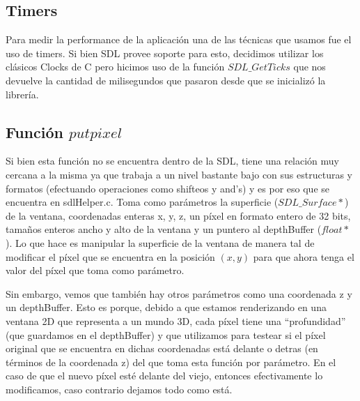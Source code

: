 \documentclass[a4paper]{article}
\begin{document}
\subsection{Timers}
Para medir la performance de la aplicación una de las técnicas que usamos fue el uso de timers. Si bien SDL provee soporte para esto, decidimos utilizar los clásicos Clocks de C pero hicimos uso de la función $SDL\_GetTicks$ que nos devuelve la cantidad de milisegundos que pasaron desde que se inicializó la librería.

\subsection{Función $putpixel$}
Si bien esta función no se encuentra dentro de la SDL, tiene una relación muy cercana a la misma ya que trabaja a un nivel bastante bajo con sus estructuras y formatos (efectuando operaciones como shifteos y and's) y es por eso que se encuentra en sdlHelper.c.
Toma como parámetros la superficie ($SDL\_Surface*$) de la ventana, coordenadas enteras x, y, z, un píxel en formato entero de 32 bits, tamaños enteros ancho y alto de la ventana y un puntero al depthBuffer ($float*$). Lo que hace es manipular la superficie de la ventana de manera tal de modificar el píxel que se encuentra en la posición $(x, y)$ para que ahora tenga el valor del píxel que toma como parámetro. 
\par Sin embargo, vemos que también hay otros parámetros como una coordenada z y un depthBuffer. Esto es porque, debido a que estamos renderizando en una ventana 2D que representa a un mundo 3D, cada píxel tiene una ``profundidad'' (que guardamos en el depthBuffer) y que utilizamos para testear si el píxel original que se encuentra en dichas coordenadas está delante o detras (en términos de la coordenada z) del que toma esta función por parámetro.
En el caso de que el nuevo píxel esté delante del viejo, entonces efectivamente lo modificamos, caso contrario dejamos
 todo como está.
 
\end{document}
